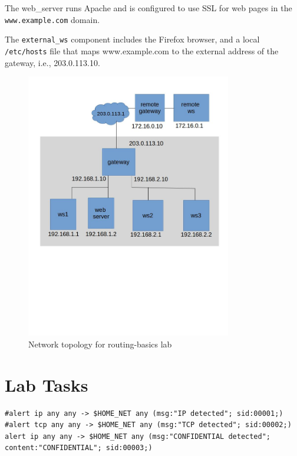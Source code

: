 The web\_server runs Apache and is configured to use SSL for web pages in the
{\tt www.example.com} domain.

The {\tt external\_ws} component includes the Firefox browser, and a local 
{\tt /etc/hosts} file that maps www.example.com to the external address of the
gateway, i.e., 203.0.113.10.


\begin{figure}[htb]
\begin{center}
\includegraphics [width=0.8\textwidth,natwidth=621,natheight=403]{routing-basics.jpg}
\end{center}
\caption{Network topology for routing-basics lab}
\label{fig:topology}
\end{figure}

\section{Lab Tasks}
\begin{verbatim}
#alert ip any any -> $HOME_NET any (msg:"IP detected"; sid:00001;)
#alert tcp any any -> $HOME_NET any (msg:"TCP detected"; sid:00002;)
alert ip any any -> $HOME_NET any (msg:"CONFIDENTIAL detected"; content:"CONFIDENTIAL"; sid:00003;)
\end{verbatim}

